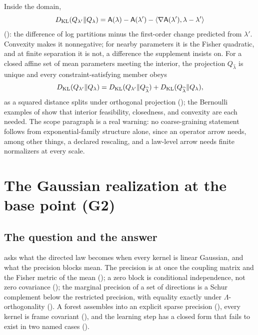 Inside the domain,
\[
D_{\mathrm{KL}}(Q_{\lambda'}\Vert Q_\lambda)=\mathsf A(\lambda)-\mathsf A(\lambda')-\langle\nabla\mathsf A(\lambda'),\lambda-\lambda'\rangle
\]
(): the difference of log partitions minus the first-order change predicted from
\(\lambda'\). Convexity makes it nonnegative; for nearby parameters it is the Fisher quadratic, and at
finite separation it is not, a difference the supplement insists on. For a closed affine set of mean
parameters meeting the interior, the projection \(Q_{\widehat\lambda}\) is unique and every
constraint-satisfying member obeys
\[
D_{\mathrm{KL}}(Q_{\lambda'}\Vert Q_\lambda)=D_{\mathrm{KL}}(Q_{\lambda'}\Vert Q_{\widehat\lambda})+D_{\mathrm{KL}}(Q_{\widehat\lambda}\Vert Q_\lambda),
\]
as a squared distance splits under orthogonal projection (); the
Bernoulli examples of  show that interior feasibility, closedness,
and convexity are each needed. The scope paragraph is a real warning: no coarse-graining statement
follows from exponential-family structure alone, since an operator arrow needs, among other things, a
declared rescaling, and a law-level arrow needs finite normalizers at every scale.

\section{The Gaussian realization at the base point (G2)}
\label{comp:sg1-realization}

\subsection{The question and the answer}

 asks what the directed law becomes when every kernel is linear Gaussian, and
what the precision blocks mean. The precision is at once the coupling matrix and the Fisher metric of the
mean (); a zero block is conditional independence, not zero
covariance (); the marginal precision of a set of directions is a
Schur complement below the restricted precision, with equality exactly under \(\Lambda\)-orthogonality
(). A forest assembles into an explicit sparse precision
(), every kernel is frame covariant
(), and the learning step has a closed form that fails to exist in two
named cases ().

